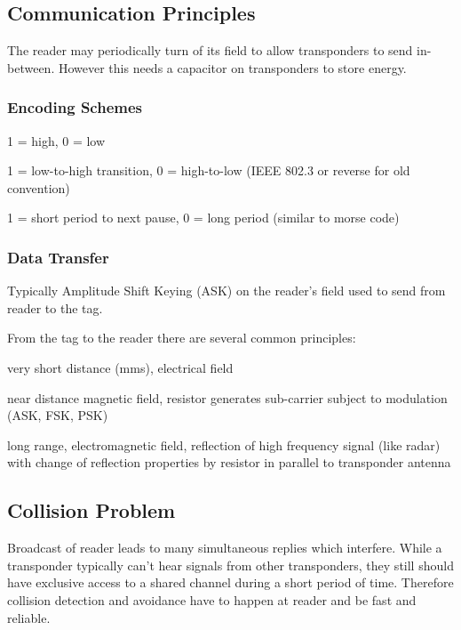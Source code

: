 \documentclass{article}
\newlength{\wideitemsep}
\let\olditem\item
\renewcommand{\item}{\setlength{\itemsep}{\wideitemsep}\olditem}
\begin{document}
\begin{multicols}{2}
\subsection{Communication Principles}
The reader may periodically turn of its field to allow transponders to send
in-between. However this needs a capacitor on transponders to store energy.

\subsubsection{Encoding Schemes}
\begin{description}
\item[NRZ] 1 = high, 0 = low
\item[Manchester Coding] 1 = low-to-high transition, 0 = high-to-low (IEEE
802.3 or reverse for old convention)
\item[Pulse Pause Coding (PPC)] 1 = short period to next pause, 0 = long period
(similar to morse code)
\end{description}

\subsubsection{Data Transfer}
Typically Amplitude Shift Keying (ASK) on the reader's field used to send from
reader to the tag.

From the tag to the reader there are several common principles:
\begin{description}
    \item[Capacitive Coupling] very short distance (mms), electrical field
    \item[Load Modulation] near distance magnetic field, resistor generates
    sub-carrier subject to modulation (ASK, FSK, PSK)
    \item[Backscatter] long range, electromagnetic field, reflection of high
    frequency signal (like radar) with change of reflection properties by
    resistor in parallel to transponder antenna
\end{description}

\subsection{Collision Problem}
Broadcast of reader leads to many simultaneous replies which interfere. While a
transponder typically can't hear signals from other transponders, they still
should have exclusive access to a shared channel during a short period of time.
Therefore collision detection and avoidance have to happen at reader and be
fast and reliable.


\end{multicols}
\end{document}
